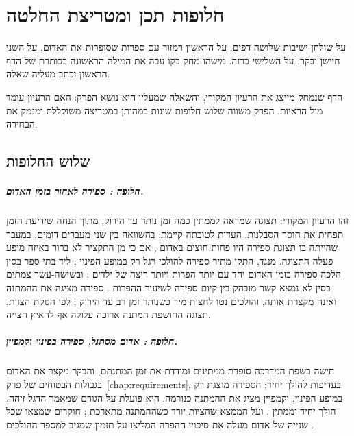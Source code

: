 \chapter{חלופות תכן ומטריצת החלטה}\label{chap:alternatives}
\begin{scenebox}
על שולחן ישיבות שלושה דפים. על הראשון רמזור עם ספרות שסופרות את האדום, על השני חיישן ובקר, על השלישי כרזה.
מישהו מחק בקו עבה את המילה הראשונה בכותרת של הדף הראשון וכתב מעליה שאלה.
\end{scenebox}

הדף שנמחק מייצג את הרעיון המקורי, והשאלה שמעליו היא נושא הפרק: האם הרעיון עומד מול הראיות. הפרק משווה שלוש חלופות שונות במהותן במטריצה משוקללת ומנמק את הבחירה.

\section{שלוש החלופות}
\paragraph{חלופה : ספירה לאחור בזמן האדום.}
זהו הרעיון המקורי: תצוגה שמראה לממתין כמה זמן נותר עד הירוק, מתוך הנחה שידיעת הזמן תפחית את חוסר הסבלנות.
העדות לטובתה קיימת: בהשוואה בין שני מעברים דומים, במעבר שהייתה בו תצוגת ספירה היו פחות חוצים באדום \cite{lipovac2013jte}, אם כי מן התקציר לא ברור באיזה מופע פעלה התצוגה.
מנגד, התקן מתיר ספירה להולכי רגל רק במופע הפינוי \cite{fhwa2025mutcd}; ליד בתי ספר בסין הלכה ספירה בזמן האדום יחד עם יותר הפרות ויותר ריצה של ילדים \cite{fu2016}; ובשישה-עשר צמתים בסין לא נמצא קשר מובהק בין קיום ספירה לשיעור ההפרות \cite{xing2022}.
ספירה מציגה את ההמתנה ואינה מקצרת אותה, והולכים נטו לחצות מיד כשנותר זמן רב עד הירוק \cite{shah2024}; לפי הסקת הצוות, תצוגה החושפת המתנה ארוכה עלולה אף להאיץ חצייה.

\paragraph{חלופה : אדום מסתגל, ספירה בפינוי וקמפיין.}
חישה בשפת המדרכה סופרת ממתינים ומודדת את זמן המתנתם, והבקר מקצר את האדום בגבולות הבטוחים של פרק~\ref{chap:requirements}, בעדיפות להולך יחיד; הספירה מוצגת רק במופע הפינוי, וקמפיין מציג את ההמתנה כנורמה.
היא פועלת על הגורם שמאמר הדגל זיהה, הולך יחיד וממתין \cite{rosenbloom2009}, ועל הממצא שהציות יורד כשההמתנה מתארכת \cite{vanhouten2007}; חוקרים שמצאו שכל שנייה של אדום מעלה את סיכויי ההפרה המליצו על תזמון שמגיב למספר ההולכים \cite{zhu2021}.

